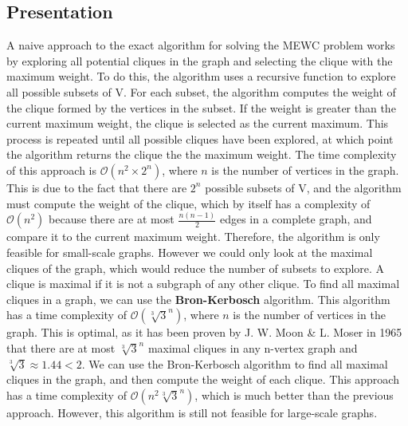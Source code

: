 \subsection{Presentation}

A naive approach to the exact algorithm for solving the MEWC problem works by
exploring all potential cliques in the graph and selecting the clique with the
maximum weight. To do this, the algorithm uses a recursive function to explore
all possible subsets of V. For each subset, the algorithm computes the weight of
the clique formed by the vertices in the subset. If the weight is greater than the
current maximum weight, the clique is selected as the current maximum. This
process is repeated until all possible cliques have been explored, at which point
the algorithm returns the clique the the maximum weight.
\newline \newline
The time complexity of this approach is $\mathcal{O}(n^2\times2^n)$, where $n$
is the number of vertices in the graph. This is due to the fact that there are
$2^n$ possible subsets of V, and the algorithm must compute the weight of the clique,
which by itself has a complexity of $\mathcal{O}(n^2)$ because there are at most
$\frac{n(n-1)}{2}$ edges in a complete graph, and compare it to the current
maximum weight. Therefore, the algorithm is only feasible for small-scale graphs.
\newline \newline
However we could only look at the maximal cliques of the graph, which would
reduce the number of subsets to explore. A clique is maximal if it is not a
subgraph of any other clique. To find all maximal cliques in a graph, we can use
the \textbf{Bron-Kerbosch} algorithm\cite{finding-all-cliques-of-an-undirected-graph}.
This algorithm has a time complexity of $\mathcal{O}(\sqrt[3]{3}^n)$, where $n$
is the number of vertices in the graph. This is optimal, as it has been proven by
J. W. Moon \& L. Moser in 1965\cite{on-cliques-in-graphs} that there are at most
$\sqrt[3]{3}^n$ maximal cliques in any n-vertex graph and $\sqrt[3]{3} \approx 1.44 < 2$.
\newline \newline
We can use the Bron-Kerbosch algorithm to find all maximal cliques in the graph,
and then compute the weight of each clique. This approach has a time complexity of
$\mathcal{O}(n^2\sqrt[3]{3}^n)$, which is much better than the previous
approach. However, this algorithm is still not feasible for large-scale graphs.